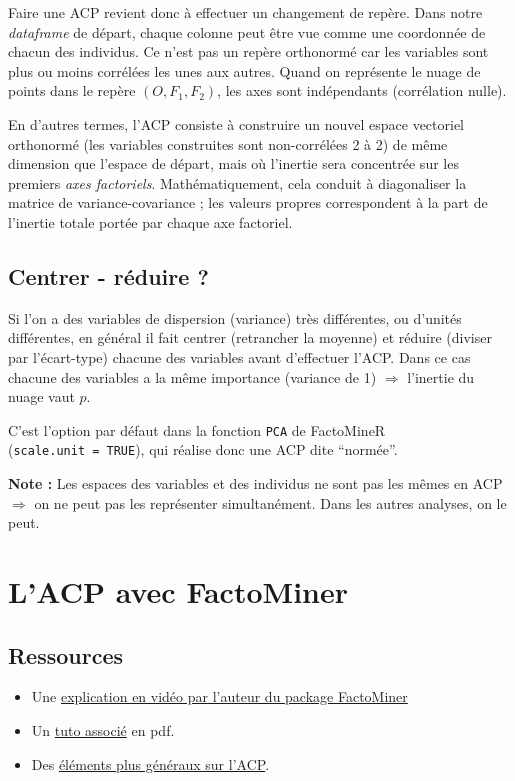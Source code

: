 \documentclass[]{book}
\providecommand{\tightlist}{%
  \setlength{\itemsep}{0pt}\setlength{\parskip}{0pt}}
\begin{document}
Faire une ACP revient donc à effectuer un changement de repère. Dans notre \emph{dataframe} de départ, chaque colonne peut être vue comme une coordonnée de chacun des individus. Ce n'est pas un repère orthonormé car les variables sont plus ou moins corrélées les unes aux autres. Quand on représente le nuage de points dans le repère \((O, F_1, F_2)\), les axes sont indépendants (corrélation nulle).

En d'autres termes, l'ACP consiste à construire un nouvel espace vectoriel orthonormé (les variables construites sont non-corrélées 2 à 2) de même dimension que l'espace de départ, mais où l'inertie sera concentrée sur les premiers \emph{axes factoriels}. Mathématiquement, cela conduit à diagonaliser la matrice de variance-covariance ; les valeurs propres correspondent à la part de l'inertie totale portée par chaque axe factoriel.

\hypertarget{centrer---reduire}{%
\subsection{Centrer - réduire ?}\label{centrer---reduire}}

Si l'on a des variables de dispersion (variance) très différentes, ou d'unités différentes, en général il fait centrer (retrancher la moyenne) et réduire (diviser par l'écart-type) chacune des variables avant d'effectuer l'ACP. Dans ce cas chacune des variables a la même importance (variance de 1) \(\Rightarrow\) l'inertie du nuage vaut \(p\).

C'est l'option par défaut dans la fonction \texttt{PCA} de FactoMineR (\texttt{scale.unit\ =\ TRUE}), qui réalise donc une ACP dite ``normée''.

\textbf{Note :} Les espaces des variables et des individus ne sont pas les mêmes en ACP \(\Rightarrow\) on ne peut pas les représenter simultanément. Dans les autres analyses, on le peut.

\hypertarget{lacp-avec-factominer}{%
\section{L'ACP avec FactoMiner}\label{lacp-avec-factominer}}

\hypertarget{ressources}{%
\subsection{Ressources}\label{ressources}}

\begin{itemize}
\tightlist
\item
  Une \href{https://www.youtube.com/watch?v=1QPRsg3Bxok}{explication en vidéo par l'auteur du package FactoMiner}
\item
  Un \href{http://factominer.free.fr/course/doc/AnaDo_ACP_Facto_Decathlon_Markdown.pdf}{tuto associé} en pdf.
\item
  Des \href{http://www.math.univ-toulouse.fr/~besse/Wikistat/pdf/st-m-explo-acp}{éléments plus généraux sur l'ACP}.
\end{itemize}
\end{document}
